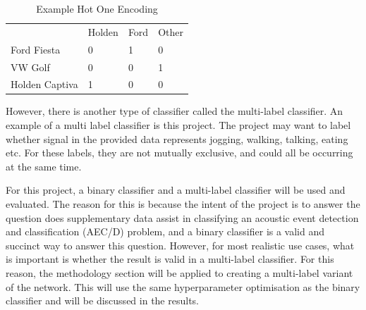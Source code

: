 \documentclass{UoNMCHA}
\numberwithin{equation}{section}
\begin{document}
\begin{table}[h]
    \begin{center}  
    \caption{Example Hot One Encoding}\label{tab:HotOneEnc}
        \begin{tabular}{llll}
                           & Holden & Ford & Other \\
            Ford Fiesta    & 0      & 1    & 0     \\
            VW Golf        & 0      & 0    & 1     \\
            Holden Captiva & 1      & 0    & 0    
        \end{tabular}
    \end{center}
\end{table}

However, there is another type of classifier called the multi-label classifier. An example of a multi label classifier is this project. The project may want to label whether signal in the provided data represents jogging, walking, talking, eating etc. For these labels, they are not mutually exclusive, and could all be occurring at the same time.

For this project, a binary classifier and a multi-label classifier will be used and evaluated. The reason for this is because the intent of the project is to answer the question does supplementary data assist in classifying an acoustic event detection and classification (AEC/D) problem, and a binary classifier is a valid and succinct way to answer this question. However, for most realistic use cases, what is important is whether the result is valid in a multi-label classifier. For this reason, the methodology section will be applied to creating a multi-label variant of the network. This will use the same hyperparameter optimisation as the binary classifier and will be discussed in the results. 


\end{document}

